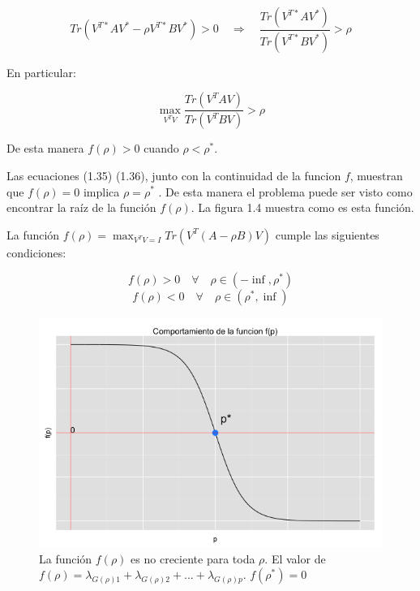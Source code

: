 \begin{equation*}
Tr(V^{T*} A V^* - \rho V^{T*} B V^*) > 0 \quad \Longrightarrow \quad \frac{Tr(V^{T*} A V^*)}{Tr(V^{T*} B V^{*})} > \rho
\end{equation*}

En particular:

\begin{equation*}
\max_{V^TV} \frac{Tr(V^{T} A V)}{Tr(V^{T} B V)} > \rho
\end{equation*}

De esta manera $f(\rho) > 0$ cuando $\rho < \rho^*$.


Las ecuaciones (1.35) (1.36), junto con la continuidad de la funcion $f$, muestran que $f(\rho) = 0$ implica $\rho = \rho^*$ \cite{ngo2012trace}. De esta manera el problema puede ser visto como encontrar la raíz de la función $f(\rho)$. La figura 1.4 muestra como es esta función.

\begin{corollary}
La función $f(\rho) = \max_{V^TV = I} Tr(V^T (A -\rho B)V)$ cumple las siguientes condiciones:

$$f(\rho) > 0  \quad \forall \quad \rho \in (-\inf, \rho^*)$$
$$f(\rho) < 0  \quad \forall \quad \rho \in (\rho^*, \inf)$$

\end{corollary}

\begin{figure}[!ht]\label{Fig1.3}
  \centering
	\includegraphics[width=1\textwidth]{Figures/Chapter2_fp}	
  \caption[Comportamiento de $f(\rho)$.]
  {La función $f(\rho)$ es no creciente para toda $\rho$. El valor de $f(\rho) = \lambda_{G(\rho)1}+ \lambda_{G(\rho)2} + ... +\lambda_{G(\rho)p}.$ $f(\rho^*) = 0 $}
\end{figure}


